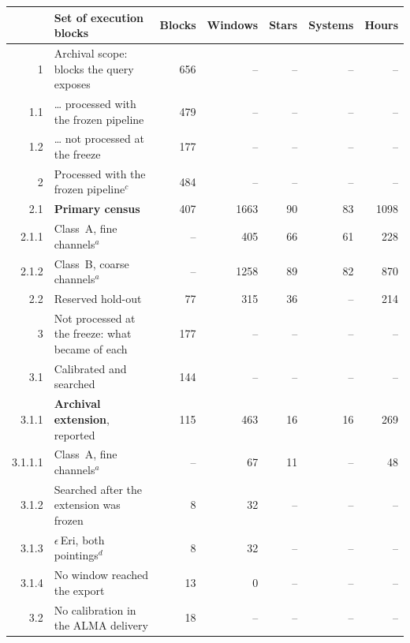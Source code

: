 \begin{tabular}{@{}r@{~}p{}rrrrr@{}}
\hline
 & Set of execution blocks & Blocks & Windows & Stars & Systems & Hours \\
\hline
1 & Archival scope: blocks the query exposes & 656 & -- & -- & -- & -- \\
1.1 & \hspace{0.8em}\ldots{} processed with the frozen pipeline & 479 & -- & -- & -- & -- \\
1.2 & \hspace{0.8em}\ldots{} not processed at the freeze & 177 & -- & -- & -- & -- \\
\hline
2 & Processed with the frozen pipeline$^{c}$ & 484 & -- & -- & -- & -- \\
2.1 & \hspace{0.8em}\textbf{Primary census} & 407 & 1663 & 90 & 83 & 1098 \\
2.1.1 & \hspace{1.6em}Class~A, fine channels$^{a}$ & -- & 405 & 66 & 61 & 228 \\
2.1.2 & \hspace{1.6em}Class~B, coarse channels$^{a}$ & -- & 1258 & 89 & 82 & 870 \\
2.2 & \hspace{0.8em}Reserved hold-out & 77 & 315 & 36 & -- & 214 \\
\hline
3 & Not processed at the freeze: what became of each & 177 & -- & -- & -- & -- \\
3.1 & \hspace{0.8em}Calibrated and searched & 144 & -- & -- & -- & -- \\
3.1.1 & \hspace{1.6em}\textbf{Archival extension}, reported & 115 & 463 & 16 & 16 & 269 \\
3.1.1.1 & \hspace{2.4em}Class~A, fine channels$^{a}$ & -- & 67 & 11 & -- & 48 \\
3.1.2 & \hspace{1.6em}Searched after the extension was frozen & 8 & 32 & -- & -- & -- \\
3.1.3 & \hspace{1.6em}$\epsilon$\,Eri, both pointings$^{d}$ & 8 & 32 & -- & -- & -- \\
3.1.4 & \hspace{1.6em}No window reached the export & 13 & 0 & -- & -- & -- \\
3.2 & \hspace{0.8em}No calibration in the ALMA delivery & 18 & -- & -- & -- & -- \\

\end{tabular}
